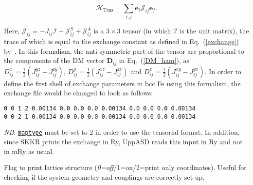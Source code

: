 \documentclass[11pt,fleqn,a4]{book} %
\makeatletter
\newcommand{\litem}[1]{\item[\bfseries#1\index{#1@\texttt{#1}}\label{#1}]}
\newcommand{\rkeyword}[1]{\hyperref[#1]{\texttt{#1}}}
\makeatother
\begin{document}
\begin{description}[leftmargin=!,labelwidth=\widthof{\bfseries fifteenchars}]
\begin{declaration} 
\begin{equation}
 \mathcal{H}_{\mathrm{Tens}} = \sum_{i,j} \mathbf{e}_i \mathcal{J}_{ij} \mathbf{e}_j.
\end{equation}
\end{declaration}

Here, $\mathcal{J}_{ij}=-J_{ij}\mathcal{I} + \mathcal{J}^S_{ij} +  \mathcal{J}^A_{ij}$ is a $3 \times 3$ tensor (in which $\mathcal{I}$ is the unit matrix), the trace of which is equal to the exchange constant as defined in Eq.~(\ref{exchange}) by~\cite{Udvardi2003}. 
%
%
In this formalism, the anti-symmetric part of the tensor are proportional to the components of the DM vector $\mathbf{D}_{ij}$ in Eq.~(\ref{DM_ham}), as $D_{ij}^x=\frac{1}{2}(J_{ij}^{yz}-J_{ij}^{zy})$, $D_{ij}^y=\frac{1}{2}(J_{ij}^{xz}-J_{ij}^{zx})$ and $D_{ij}^z=\frac{1}{2}(J_{ij}^{xy}-J_{ij}^{yx})$. In order to define the first shell of exchange parameters in bcc Fe using this formalism, the exchange file would be changed to look as follows:

\begin{fBox} 
\begin{Verbatim}
0 0 1 2 0.00134 0.0 0.0 0.0 0.00134 0.0 0.0 0.0 0.00134
0 0 2 1 0.00134 0.0 0.0 0.0 0.00134 0.0 0.0 0.0 0.00134
\end{Verbatim}
\end{fBox}

\emph{NB}: \rkeyword{maptype} must be set to 2 in order to use the tensorial format. In addition, since SKKR prints the exchange in Ry, UppASD reads this input in Ry and not in mRy as usual. 
\litem{do_prnstruct} Flag to print lattice structure (\emph{0=off}/1=on/2=print only coordinates). Useful for checking if the system geometry and couplings are correctly set up. 

\end{description}

\end{document}
